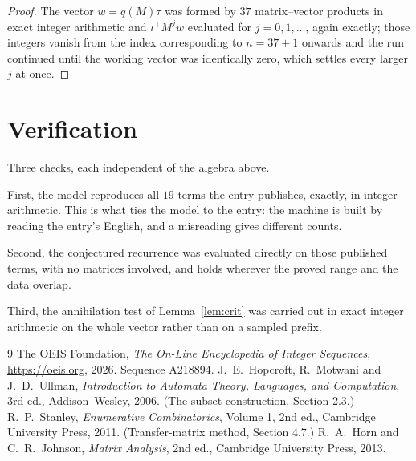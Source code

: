 \documentclass[11pt,a4paper]{article}
\theoremstyle{plain}
\theoremstyle{definition}
\begin{document}
\begin{proof}
The vector $w=q(M)\tau$ was formed by $37$ matrix--vector products in exact integer
arithmetic and $\iota^{\!\top}M^{j}w$ evaluated for $j=0,1,\dots$, again exactly; those
integers vanish from the index corresponding to $n=37+1$ onwards and the run continued
until the working vector was identically zero, which settles every larger $j$ at once.
\end{proof}

\section{Verification}

Three checks, each independent of the algebra above.

First, the model reproduces all $19$ terms the entry publishes, exactly, in integer
arithmetic. This is what ties the model to the entry: the machine is built by reading the
entry's English, and a misreading gives different counts.

Second, the conjectured recurrence was evaluated directly on those published terms, with no
matrices involved, and holds wherever the proved range and the data overlap.

Third, the annihilation test of Lemma~\ref{lem:crit} was carried out in exact integer
arithmetic on the whole vector rather than on a sampled prefix.

\begin{thebibliography}{9}
 The OEIS Foundation, \emph{The On-Line Encyclopedia of Integer
Sequences}, \url{https://oeis.org}, 2026. Sequence A218894.
 J.~E.~Hopcroft, R.~Motwani and J.~D.~Ullman, \emph{Introduction to Automata
Theory, Languages, and Computation}, 3rd ed., Addison--Wesley, 2006. (The subset
construction, Section 2.3.)
 R.~P.~Stanley, \emph{Enumerative Combinatorics}, Volume 1, 2nd ed.,
Cambridge University Press, 2011. (Transfer-matrix method, Section 4.7.)
 R.~A.~Horn and C.~R.~Johnson, \emph{Matrix Analysis}, 2nd ed., Cambridge
University Press, 2013.
\end{thebibliography}
\end{document}

